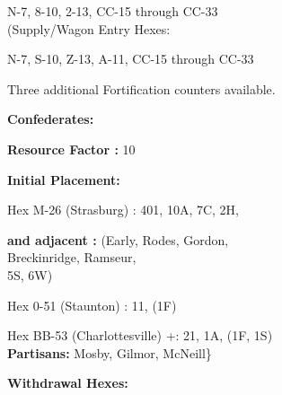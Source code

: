 \begin{scenariodata}
N-7, 8-10, 2-13, CC-15 through CC-33\\
(Supply/Wagon Entry Hexes:\\
\end{scenariodata}

\begin{scenariodata}
N-7, S-10, Z-13, A-11, CC-15 through CC-33\\
\end{scenariodata}

Three additional Fortification counters available.

\begin{scenariodata}
\textbf{Confederates:}\\
\end{scenariodata}

\begin{scenariodata}
\textbf{Resource Factor :} 10\\
\end{scenariodata}

\begin{scenariodata}
\textbf{Initial Placement:}\\
\end{scenariodata}

\begin{scenariodata}
Hex M-26 (Strasburg) : 401, 10A, 7C, 2H,\\
\end{scenariodata}

\begin{scenariodata}
\textbf{and adjacent :} (Early, Rodes, Gordon,\\
Breckinridge, Ramseur,\\
5S, 6W)\\
\end{scenariodata}

\begin{scenariodata}
Hex 0-51 (Staunton) : 11, (1F)\\
\end{scenariodata}

\begin{scenariodata}
Hex BB-53 (Charlottesville) +: 21, 1A, (1F, 1S)\\
\textbf{Partisans:} Mosby, Gilmor, McNeill\}\\
\end{scenariodata}

\begin{scenariodata}
\textbf{Withdrawal Hexes:}\\
\end{scenariodata}

